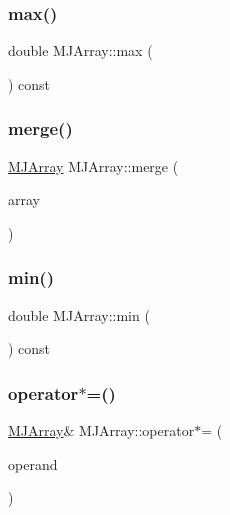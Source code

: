 \subsubsection{\texorpdfstring{max()}{max()}}
{\footnotesize\ttfamily double M\+J\+Array\+::max (\begin{DoxyParamCaption}{ }\end{DoxyParamCaption}) const}

\hypertarget{classMJArray_aa7ce6c82b0da3b3a6b691327c83500f0}{}\label{classMJArray_aa7ce6c82b0da3b3a6b691327c83500f0} 
\subsubsection{\texorpdfstring{merge()}{merge()}}
{\footnotesize\ttfamily \hyperlink{classMJArray}{M\+J\+Array} M\+J\+Array\+::merge (\begin{DoxyParamCaption}\item[{const \hyperlink{classMJArray}{M\+J\+Array} \&}]{array }\end{DoxyParamCaption})}

\hypertarget{classMJArray_afb89bd41c6b811616336d4dd7f7697fb}{}\label{classMJArray_afb89bd41c6b811616336d4dd7f7697fb} 
\subsubsection{\texorpdfstring{min()}{min()}}
{\footnotesize\ttfamily double M\+J\+Array\+::min (\begin{DoxyParamCaption}{ }\end{DoxyParamCaption}) const}

\hypertarget{classMJArray_a00f266e67cd2e280235a3733bc86efaa}{}\label{classMJArray_a00f266e67cd2e280235a3733bc86efaa} 
\subsubsection{\texorpdfstring{operator$\ast$=()}{operator*=()}\hspace{0.1cm}{\footnotesize\ttfamily [1/2]}}
{\footnotesize\ttfamily \hyperlink{classMJArray}{M\+J\+Array}\& M\+J\+Array\+::operator$\ast$= (\begin{DoxyParamCaption}\item[{const \hyperlink{classMJArray}{M\+J\+Array} \&}]{operand }\end{DoxyParamCaption})}


